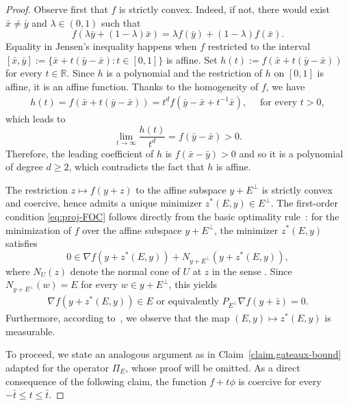 \documentclass[11pt]{article}
\theoremstyle{definition}
\numberwithin{equation}{section}
\newcommand{\R}{\mathbb{R}}
\begin{document}
\begin{proof}
Observe first that $f$ is strictly convex.
Indeed, if not, there would exist $\bar x \neq \bar y$ and $\lambda \in (0, 1)$ such that
\[
  f(\lambda \bar y + (1 - \lambda) \bar x) = \lambda f(\bar y) + (1 - \lambda) f(\bar x).  
\]
Equality in Jensen's inequality happens when $f$ restricted to the interval $[\bar x, \bar y] := \big\{ \bar x + t (\bar y - \bar x): t \in [0, 1] \big\}$ is affine.
Set $h(t) := f(\bar x + t(\bar y - \bar x))$ for every $t \in \R$.
Since $h$ is a polynomial and the restriction of $h$ on $[0, 1]$ is affine, it is an affine function. 
Thanks to the homogeneity of $f$, we have
\begin{align*}
    h(t) = f(\bar x + t(\bar y - \bar x)) = t^d f(\bar y - \bar x + t^{-1}\bar x), \quad \text{ for every } t > 0,
\end{align*}
which leads to 
\[
    \lim_{t \to \infty} \dfrac{h(t)}{t^d} = f(\bar y - \bar x) > 0.
\]
Therefore, the leading coefficient of $h$ is $f(\bar x - \bar y) > 0$ and so it is a polynomial of degree $d \geq 2$, which contradicts the fact that $h$ is affine.

\medskip

The restriction $z\mapsto f(y+z)$ to the affine subspace $y+E^\perp$ is strictly convex and coercive, hence admits a unique minimizer $z^\ast(E,y)\in E^\perp$.
The first-order condition \eqref{eq:proj-FOC} follows directly from the basic optimality rule~\cite[Theorem 6.12]{RW_1998}: 
for the minimization of $f$ over the affine subspace 
$y+E^\perp$, the minimizer $z^\ast(E, y)$ satisfies
\[
0 \in \nabla f(y + z^\ast(E, y)) + N_{y + E^\perp}(y+ z^{\ast}(E, y)), 
\]
where $N_U(z)$  denote the normal cone of $U$ at $z$ in the sense \cite[Definition 6.3]{RW_1998}.
Since $N_{y+E^\perp}(w) = E$ for every $w \in y + E^\perp$, this yields 
\begin{align*}
    \text{$\nabla f(y+ z^*(E, y)) \in E$ or equivalently 
$P_{E^\perp}\nabla f(y+\bar z)=0$.}
\end{align*}
Furthermore, according to~\cite[Theorem 14.37]{RW_1998}, we observe that the map $(E, y) \mapsto z^\ast(E, y)$ is measurable.

\medskip

To proceed, we state an analogous argument as in Claim~\ref{claim.gateaux-bound} adapted for the operator $\Pi_E$, whose proof will be omitted.
As a direct consequence of the following claim, the function $f  + t \phi$ is coercive for every $-\bar t \leq t \leq \bar t$.


\end{proof}
\end{document}
